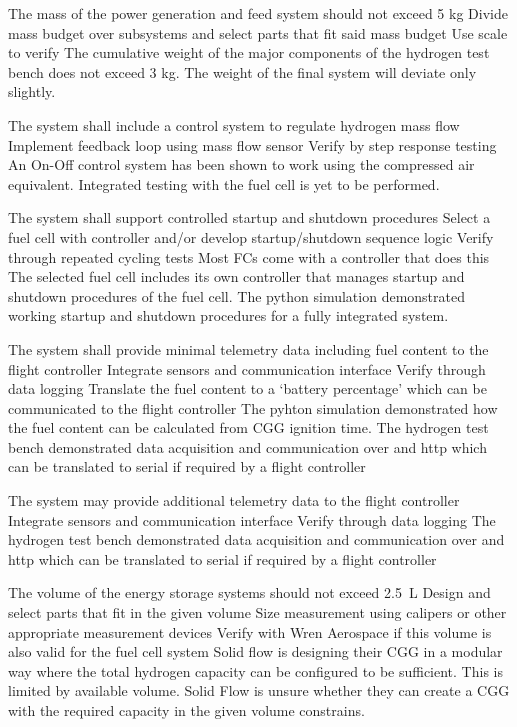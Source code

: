 {The mass of the power generation and feed system should not exceed 5 kg}
{Divide mass budget over subsystems and select parts that fit said mass budget}
{Use scale to verify}
{}
{The cumulative weight of the major components of the hydrogen test bench does not exceed 3 kg. The weight of the final system will deviate only slightly.}
{}

{The system shall include a control system to regulate hydrogen mass flow}
{Implement feedback loop using mass flow sensor}
{Verify by step response testing}
{}
{An On-Off control system has been shown to work using the compressed air equivalent. Integrated testing with the fuel cell is yet to be performed.}
{}

{The system shall support controlled startup and shutdown procedures}
{Select a fuel cell with controller and/or develop startup/shutdown sequence logic}
{Verify through repeated cycling tests}
{Most FCs come with a controller that does this}
{The selected fuel cell includes its own controller that manages startup and shutdown procedures of the fuel cell. The python simulation demonstrated working startup and shutdown procedures for a fully integrated system.}
{}

{The system shall provide minimal telemetry data including fuel content to the flight controller}
{Integrate sensors and communication interface}
{Verify through data logging}
{Translate the fuel content to a `battery percentage' which can be communicated to the flight controller}
{The pyhton simulation demonstrated how the fuel content can be calculated from CGG ignition time. The hydrogen test bench demonstrated data acquisition and communication over \iic and http which can be translated to serial if required by a flight controller}
{}

{The system may provide additional telemetry data to the flight controller}
{Integrate sensors and communication interface}
{Verify through data logging}
{}
{The hydrogen test bench demonstrated data acquisition and communication over \iic and http which can be translated to serial if required by a flight controller}
{}

{The volume of the energy storage systems should not exceed 2.5~L}
{Design and select parts that fit in the given volume}
{Size measurement using calipers or other appropriate measurement devices}
{Verify with Wren Aerospace if this volume is also valid for the fuel cell system}
{Solid flow is designing their CGG in a modular way where the total hydrogen capacity can be configured to be sufficient. This is limited by available volume. Solid Flow is unsure whether they can create a CGG with the required capacity in the given volume constrains.}
{}

